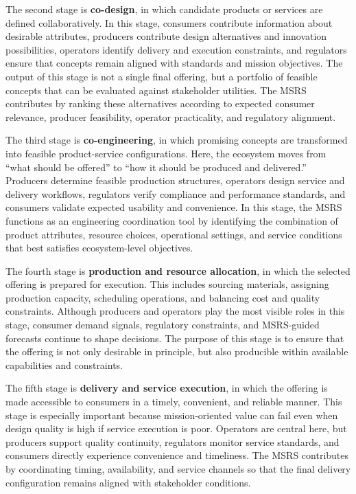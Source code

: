 \documentclass[
  letterpaper,
  DIV=11,
  numbers=noendperiod]{scrartcl}
\begin{document}
The second stage is \textbf{co-design}, in which candidate products or
services are defined collaboratively. In this stage, consumers
contribute information about desirable attributes, producers contribute
design alternatives and innovation possibilities, operators identify
delivery and execution constraints, and regulators ensure that concepts
remain aligned with standards and mission objectives. The output of this
stage is not a single final offering, but a portfolio of feasible
concepts that can be evaluated against stakeholder utilities. The MSRS
contributes by ranking these alternatives according to expected consumer
relevance, producer feasibility, operator practicality, and regulatory
alignment.

The third stage is \textbf{co-engineering}, in which promising concepts
are transformed into feasible product-service configurations. Here, the
ecosystem moves from ``what should be offered'' to ``how it should be
produced and delivered.'' Producers determine feasible production
structures, operators design service and delivery workflows, regulators
verify compliance and performance standards, and consumers validate
expected usability and convenience. In this stage, the MSRS functions as
an engineering coordination tool by identifying the combination of
product attributes, resource choices, operational settings, and service
conditions that best satisfies ecosystem-level objectives.

The fourth stage is \textbf{production and resource allocation}, in
which the selected offering is prepared for execution. This includes
sourcing materials, assigning production capacity, scheduling
operations, and balancing cost and quality constraints. Although
producers and operators play the most visible roles in this stage,
consumer demand signals, regulatory constraints, and MSRS-guided
forecasts continue to shape decisions. The purpose of this stage is to
ensure that the offering is not only desirable in principle, but also
producible within available capabilities and constraints.

The fifth stage is \textbf{delivery and service execution}, in which the
offering is made accessible to consumers in a timely, convenient, and
reliable manner. This stage is especially important because
mission-oriented value can fail even when design quality is high if
service execution is poor. Operators are central here, but producers
support quality continuity, regulators monitor service standards, and
consumers directly experience convenience and timeliness. The MSRS
contributes by coordinating timing, availability, and service channels
so that the final delivery configuration remains aligned with
stakeholder conditions.
\end{document}
